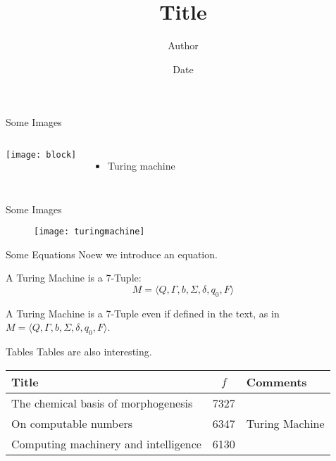 \documentclass{beamer}
\title              {Title}
\author             {Author}
\institute          {Institute, University of Basel}
\date               {Date}
\begin{document}
\begin{frame}[t,plain]
\titlepage
\end{frame}


\begin{frame}[c]{Some Images}
\begin{columns}
            \texttt{[image: block]}
            \begin{itemize}
            \item Turing machine 
            \end{itemize}
\end{columns}
\end{frame}


\begin{frame}[c]{Some Images}
    \begin{figure}
        \texttt{[image: turingmachine]}
    \end{figure}
\end{frame}


\begin{frame}[c]{Some Equations}
Noew we introduce an equation.
\begin{theorem}
A Turing Machine is a 7-Tuple:
\begin{equation}
    M = \langle Q, \Gamma, b, \Sigma, \delta, q_0, F \rangle
\end{equation}
\end{theorem}
A Turing Machine is a 7-Tuple even if defined in the text, as in $M = \langle Q, \Gamma, b, \Sigma, \delta, q_0, F \rangle$.
\end{frame}


\begin{frame}[c]{Tables}
Tables are also interesting.
\begin{table}[ht!]
\centering
\begin{tabular}{|l|c|l|} \hline
Title&$f$&Comments\\ \hline
The chemical basis of morphogenesis & 7327 & \\ \hline
On computable numbers & 6347 & Turing Machine\\ \hline
Computing machinery and intelligence & 6130 & \\ \hline
\end{tabular}
\end{table}
\end{frame}
\end{document}
